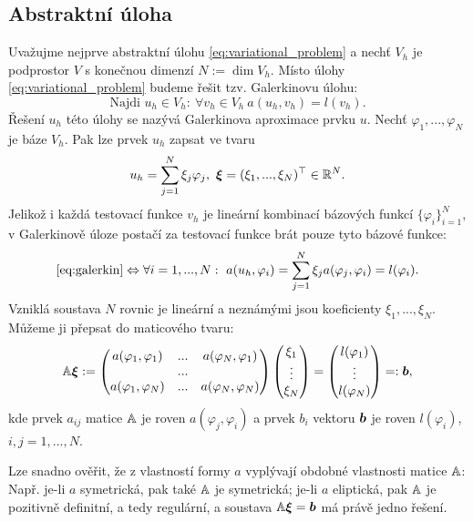 \subsection{Abstraktní úloha}

Uvažujme nejprve abstraktní úlohu \eqref{eq:variational_problem} a nechť $V_h$ je podprostor $V$ s konečnou dimenzí $N:=\dim V_h$.
Místo úlohy \eqref{eq:variational_problem} budeme řešit tzv. Galerkinovu úlohu:
\begin{equation}\label{eq:galerkin}
\mbox{Najdi }u_h\in V_h:~\forall v_h\in V_h~a(u_h,v_h)=l(v_h).
\end{equation}
Řešení $u_h$ této úlohy se nazývá Galerkinova aproximace prvku $u$.
Nechť $\varphi_1,...,\varphi_N$ je báze $V_h$.
Pak lze prvek $u_h$ zapsat ve tvaru
\[ u_h=\sum_{j=1}^N\xi_j\varphi_j,~\mathbf{\boldsymbol{\xi}}=(\xi_1,...,\xi_N)^\top\in\mathbb R^N. \]
Jelikož i každá testovací funkce $v_h$ je lineární kombinací bázových funkcí $\{\varphi_i\}_{i=1}^N$, v Galerkinově úloze postačí za testovací funkce brát pouze tyto bázové funkce:
\[ \eqref{eq:galerkin} \Leftrightarrow \forall i=1,...,N:~ a(u_h,\varphi_i)=\sum_{j=1}^N\xi_j a(\varphi_j,\varphi_i) = l(\varphi_i). \]
Vzniklá soustava $N$ rovnic je lineární a neznámými jsou koeficienty $\xi_1,...,\xi_N$.
Můžeme ji přepsat do maticového tvaru:
\[ {\mathbb{A}}\mathbf{\boldsymbol{\xi}} := \begin{pmatrix}a(\varphi_1,\varphi_1) & ... & a(\varphi_N,\varphi_1)\\&...&\\a(\varphi_1,\varphi_N) & ... & a(\varphi_N,\varphi_N)\end{pmatrix}\begin{pmatrix}\xi_1\\\vdots\\\xi_N\end{pmatrix} = \begin{pmatrix}l(\varphi_1)\\\vdots\\l(\varphi_N)\end{pmatrix} =: \mathbf{\boldsymbol{b}}, \]
kde prvek $a_{ij}$ matice ${\mathbb{A}}$ je roven $a(\varphi_j,\varphi_i)$ a prvek $b_i$ vektoru $\mathbf{\boldsymbol{b}}$ je roven $l(\varphi_i)$, $i,j=1,...,N$.

Lze snadno ověřit, že z vlastností formy $a$ vyplývají obdobné vlastnosti matice ${\mathbb{A}}$: Např. je-li $a$ symetrická, pak také ${\mathbb{A}}$ je symetrická; je-li $a$ eliptická, pak ${\mathbb{A}}$ je pozitivně definitní, a tedy regulární, a soustava ${\mathbb{A}}\mathbf{\boldsymbol{\xi}}=\mathbf{\boldsymbol{b}}$ má právě jedno řešení.


